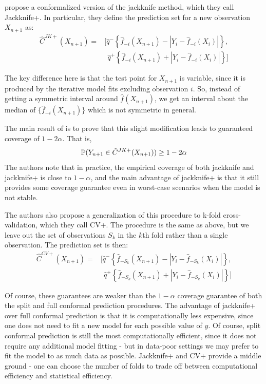 \documentclass[a4paper, 12pt]{article}
\begin{document}
\textcite{barberPredictiveInferenceJackknife2020} propose a conformalized version of the jackknife method, which they call Jackknife+. In particular, they define the prediction set for a new observation $X_{n+1}$ as:
\begin{align*}
    \hat{C}^{JK+}(X_{n+1}) =
     & \Big[ \hat{q}^{-}\left\{ \hat{f}_{-i}(X_{n+1}) - |Y_i - \hat{f}_{-i}(X_i)|\right\},   \\
     & ~~ \hat{q}^{+}\left\{ \hat{f}_{-i}(X_{n+1}) + |Y_i - \hat{f}_{-i}(X_i)|\right\} \Big]
\end{align*}

The key difference here is that the test point for $X_{n+1}$ is variable, since it is produced by the iterative model fits excluding observation $i$. So, instead of getting a symmetric interval around $\hat{f}(X_{n+1})$, we get an interval about the median of $\{\hat{f}_{-i}(X_{n+1})\}$ which is not symmetric in general.

The main result of \textcite{barberPredictiveInferenceJackknife2020} is to prove that this slight modification leads to guaranteed coverage of $1-2\alpha$. That is,
\[ \P(Y_{n+1} \in \hat{C}^{JK+}(X_{n+1})) \geq 1 - 2\alpha \]
The authors note that in practice, the empirical coverage of both jackknife and jackknife+ is close to $1-\alpha$, and the main advantage of jackknife+ is that it still provides some coverage guarantee even in worst-case scenarios when the model is not stable.

The authors also propose a generalization of this procedure to k-fold cross-validation, which they call CV+. The procedure is the same as above, but we leave out the set of observations $S_k$ in the $k$th fold rather than a single observation. The prediction set is then:
\begin{align*}
    \hat{C}^{CV+}(X_{n+1}) =
     & \Big[ \hat{q}^{-}\left\{ \hat{f}_{-S_k}(X_{n+1}) - |Y_i - \hat{f}_{-S_k}(X_i)|\right\},   \\
     & ~~ \hat{q}^{+}\left\{ \hat{f}_{-S_k}(X_{n+1}) + |Y_i - \hat{f}_{-S_k}(X_i)|\right\} \Big]
\end{align*}

Of course, these guarantees are weaker than the $1-\alpha$ coverage guarantee of both the split and full conformal prediction procedures.  The advantage of jackknife+ over full conformal prediction is that it is computationally less expensive, since one does not need to fit a new model for each possible value of $y$. Of course, split conformal prediction is still the most computationally efficient, since it does not require any additional model fitting - but in data-poor settings we may prefer to fit the model to as much data as possible. Jackknife+ and CV+ provide a middle ground - one can choose the number of folds to trade off between computational efficiency and statistical efficiency.
\end{document}
